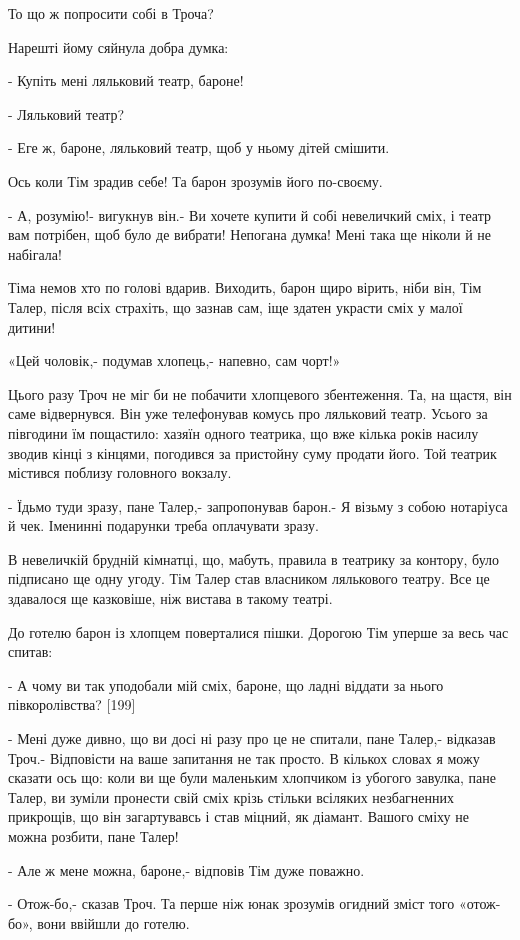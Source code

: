 То що ж попросити собі в Троча?

Нарешті йому сяйнула добра думка:

- Купіть мені ляльковий театр, бароне!

- Ляльковий театр?

- Еге ж, бароне, ляльковий театр, щоб у ньому дітей смішити.

Ось коли Тім зрадив себе! Та барон зрозумів його по-своєму.

- А, розумію!- вигукнув він.- Ви хочете купити й собі невеличкий сміх, і театр вам потрібен, щоб було де вибрати! Непогана думка! Мені така ще ніколи й не набігала!

Тіма немов хто по голові вдарив. Виходить, барон щиро вірить, ніби він, Тім Талер, після всіх страхіть, що зазнав сам, іще здатен украсти сміх у малої дитини!

«Цей чоловік,- подумав хлопець,- напевно, сам чорт!»

Цього разу Троч не міг би не побачити хлопцевого збентеження. Та, на щастя, він саме відвернувся. Він уже телефонував комусь про ляльковий театр. Усього за півгодини їм пощастило: хазяїн одного театрика, що вже кілька років насилу зводив кінці з кінцями, погодився за пристойну суму продати його. Той театрик містився поблизу головного вокзалу.

- Їдьмо туди зразу, пане Талер,- запропонував барон.- Я візьму з собою нотаріуса й чек. Іменинні подарунки треба оплачувати зразу.

В невеличкій брудній кімнатці, що, мабуть, правила в театрику за контору, було підписано ще одну угоду. Тім Талер став власником лялькового театру. Все це здавалося ще казковіше, ніж вистава в такому театрі.

До готелю барон із хлопцем поверталися пішки. Дорогою Тім уперше за весь час спитав:

- А чому ви так уподобали мій сміх, бароне, що ладні віддати за нього півкоролівства? [199]

- Мені дуже дивно, що ви досі ні разу про це не спитали, пане Талер,- відказав Троч.- Відповісти на ваше запитання не так просто. В кількох словах я можу сказати ось що: коли ви ще були маленьким хлопчиком із убогого завулка, пане Талер, ви зуміли пронести свій сміх крізь стільки всіляких незбагненних прикрощів, що він загартувавсь і став міцний, як діамант. Вашого сміху не можна розбити, пане Талер!

- Але ж мене можна, бароне,- відповів Тім дуже поважно.

- Отож-бо,- сказав Троч. Та перше ніж юнак зрозумів огидний зміст того «отож-бо», вони ввійшли до готелю.


